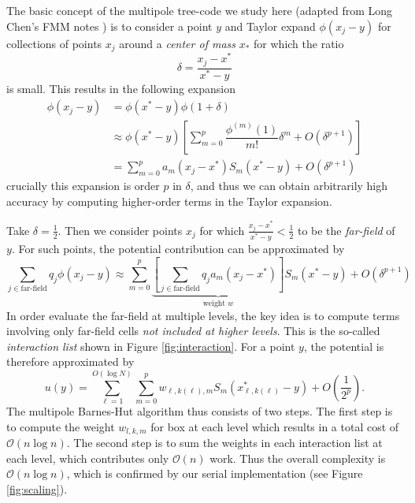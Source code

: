\documentclass{article}
\newcommand{\pr}[1]{\left(#1\right)}
\newcommand{\br}[1]{\left[#1\right]}
\renewcommand{\O}{\mathcal{O}}
\begin{document}
The basic concept of the multipole tree-code we study here (adapted from Long Chen's FMM notes \cite{chenintroduction}) is to consider a point $y$ and Taylor expand $\phi(x_j - y)$ for collections of points $x_j$ around a \textit{center of mass} $x_*$ for which the ratio
\begin{equation}
  \delta = \frac{x_j-x^*}{x^*-y}
\end{equation}
is small. This results in the following expansion
\begin{align}
  \phi(x_j-y)
  &= \phi(x^*-y)\phi(1+\delta)\\
  & \approx \phi(x^*-y)\br{\sum_{m=0}^p \dfrac{\phi^{(m)}(1)}{m!}\delta^m + O(\delta^{p+1})}\\
  & = \sum_{m=0}^p a_m(x_j-x^*)S_m(x^*-y) + O(\delta^{p+1})
\end{align}
crucially this expansion is order $p$ in $\delta$, and thus we can obtain arbitrarily high accuracy by computing higher-order terms in the Taylor expansion.

Take $\delta = \frac{1}{2}$. Then we consider points $x_j$ for which $\frac{x_j-x^*}{x^*-y} < \frac{1}{2}$ to be the \textit{far-field} of $y$. For such points, the potential contribution can be approximated by
\begin{equation}
  \sum_{j\in\text{far-field}} q_j\phi(x_j-y) \approx \sum_{m=0}^p \underbrace{\br{\sum_{j\in\text{far-field}} q_j a_m(x_j-x^*)}}_{\text{weight }w} S_m(x^*-y)+ O(\delta^{p+1})
\end{equation}
In order evaluate the far-field at multiple levels, the key idea is to compute terms involving only far-field cells \emph{not included at higher levels}. This is the so-called \textit{interaction list} shown in Figure \ref{fig:interaction}. For a point $y$, the potential is therefore approximated by
\begin{equation}
  u(y) = \sum_{\ell=1}^{O(\log N)}\sum_{m=0}^p w_{\ell,k(\ell),m} S_m\pr{x_{\ell, k(\ell)}^* - y} + O\pr{\frac{1}{2^p}}.
\end{equation}
The multipole Barnes-Hut algorithm thus consists of two steps. The first step is to compute the weight $w_{l, k, m}$ for box at each level which results in a total cost of $\O(n\log n)$. The second step is to sum the weights in each interaction list at each level, which contributes only $\O(n)$ work. Thus the overall complexity is $\O(n\log n)$, which is confirmed by our serial implementation (see Figure \ref{fig:scaling}).
\end{document}
